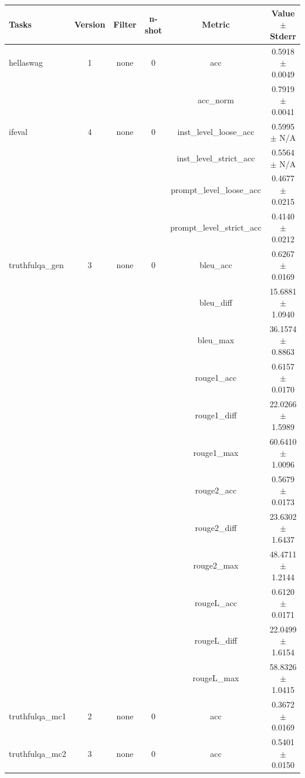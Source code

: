 \documentclass{ifacconf}
\begin{document}
\begin{strip}
\begin{minipage}{\textwidth}
			\begin{table}[H]
				\centering
				\begin{tabular}{|l|c|c|c|c|c|}
					\hline
					\textbf{Tasks} & \textbf{Version} & \textbf{Filter} & \textbf{n-shot} & \textbf{Metric} & \textbf{Value} $\pm$ \textbf{Stderr} \\ \hline
					hellaswag & 1 & none & 0 & acc & 0.5918 $\pm$ 0.0049 \\ \hline
					& & & & acc\_norm & 0.7919 $\pm$ 0.0041 \\ \hline
					ifeval & 4 & none & 0 & inst\_level\_loose\_acc & 0.5995 $\pm$ N/A \\ \hline
					& & & & inst\_level\_strict\_acc & 0.5564 $\pm$ N/A \\ \hline
					& & & & prompt\_level\_loose\_acc & 0.4677 $\pm$ 0.0215 \\ \hline
					& & & & prompt\_level\_strict\_acc & 0.4140 $\pm$ 0.0212 \\ \hline
					truthfulqa\_gen & 3 & none & 0 & bleu\_acc & 0.6267 $\pm$ 0.0169 \\ \hline
					& & & & bleu\_diff & 15.6881 $\pm$ 1.0940 \\ \hline
					& & & & bleu\_max & 36.1574 $\pm$ 0.8863 \\ \hline
					& & & & rouge1\_acc & 0.6157 $\pm$ 0.0170 \\ \hline
					& & & & rouge1\_diff & 22.0266 $\pm$ 1.5989 \\ \hline
					& & & & rouge1\_max & 60.6410 $\pm$ 1.0096 \\ \hline
					& & & & rouge2\_acc & 0.5679 $\pm$ 0.0173 \\ \hline
					& & & & rouge2\_diff & 23.6302 $\pm$ 1.6437 \\ \hline
					& & & & rouge2\_max & 48.4711 $\pm$ 1.2144 \\ \hline
					& & & & rougeL\_acc & 0.6120 $\pm$ 0.0171 \\ \hline
					& & & & rougeL\_diff & 22.0499 $\pm$ 1.6154 \\ \hline
					& & & & rougeL\_max & 58.8326 $\pm$ 1.0415 \\ \hline
					truthfulqa\_mc1 & 2 & none & 0 & acc & 0.3672 $\pm$ 0.0169 \\ \hline
					truthfulqa\_mc2 & 3 & none & 0 & acc & 0.5401 $\pm$ 0.0150 \\ \hline
				\end{tabular}
				\label{tab:llama31_q8}
			\end{table}
			

\end{minipage}
\end{strip}
\end{document}

